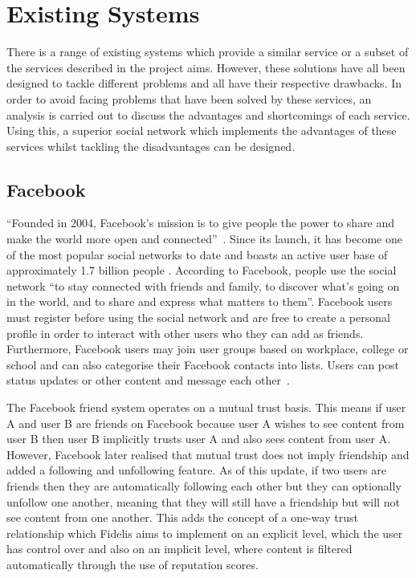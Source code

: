 \section{Existing Systems}
There is a range of existing systems which provide a similar service or a subset of the services described in the project aims. However, these solutions have all been designed to tackle different problems and all have their respective drawbacks. In order to avoid facing problems that have been solved by these services, an analysis is carried out to discuss the advantages and shortcomings of each service. Using this, a superior social network which implements the advantages of these services whilst tackling the disadvantages can be designed.

\subsection{Facebook}
``Founded in 2004, Facebook's mission is to give people the power to share and make the world more open and connected''~\cite{Facebook:About}. Since its launch, it has become one of the most popular social networks to date and boasts an active user base of approximately 1.7 billion people \cite{Statista:Facebook}. According to Facebook, people use the social network ``to stay connected with friends and family, to discover what's going on in the world, and to share and express what matters to them''. Facebook users must register before using the social network and are free to create a personal profile in order to interact with other users who they can add as friends. Furthermore, Facebook users may join user groups based on workplace, college or school and can also categorise their Facebook contacts into lists. Users can post status updates or other content and message each other~\cite{Statista:Facebook}. 

The Facebook friend system operates on a mutual trust basis. This means if user A and user B are friends on Facebook because user A wishes to see content from user B then user B implicitly trusts user A and also sees content from user A. However, Facebook later realised that mutual trust does not imply friendship and added a following and unfollowing feature. As of this update, if two users are friends then they are automatically following each other but they can optionally unfollow one another, meaning that they will still have a friendship but will not see content from one another. This adds the concept of a one-way trust relationship which Fidelis aims to implement on an explicit level, which the user has control over and also on an implicit level, where content is filtered automatically through the use of reputation scores.

